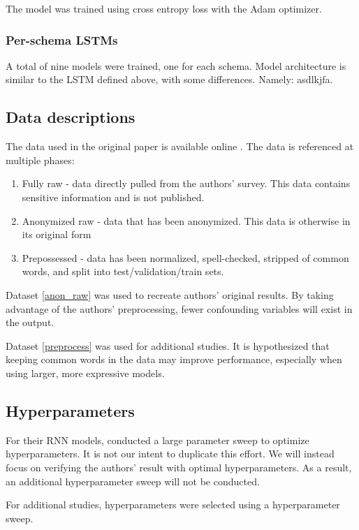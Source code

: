 \documentclass[11pt,a4paper]{article}
\begin{document}
The model was trained using cross entropy loss with the Adam optimizer. 

\subsubsection{Per-schema LSTMs}
A total of nine models were trained, one for each schema. Model architecture is similar to the LSTM defined above, with some differences. Namely: asdlkjfa. 

\subsection{Data descriptions}
The data used in the original paper is available online \citep{burger_2021_data}. The data is referenced at multiple phases: 
\begin{enumerate}
    \item Fully raw - data directly pulled from the authors' survey. This data contains sensitive information and is not published. 
    \item Anonymized raw - data that has been anonymized. This data is otherwise in its original form
    \label{anon_raw}
    \item Prepossessed - data has been normalized, spell-checked, stripped of common words, and split into test/validation/train sets. 
    \label{preprocess}
\end{enumerate}

Dataset \ref{anon_raw} was used to recreate authors' original results. By taking advantage of the authors' preprocessing, fewer confounding variables will exist in the output. 

Dataset \ref{preprocess} was used for additional studies. It is hypothesized that keeping common words in the data may improve performance, especially when using larger, more expressive models. 

\subsection{Hyperparameters}
For their RNN models, \citeauthor{burger_2021} conducted a large parameter sweep to optimize hyperparameters. It is not our intent to duplicate this effort. We will instead focus on verifying the authors' result with optimal hyperparameters. As a result, an additional hyperparameter sweep will not be conducted. 

For additional studies, hyperparameters were selected using a hyperparameter sweep. 
\end{document}
